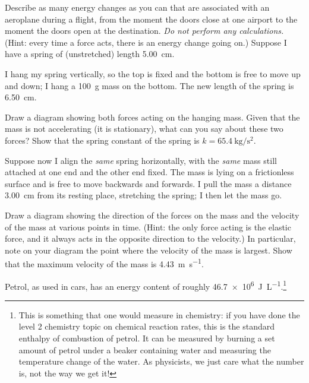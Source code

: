 \documentclass[answers]{exam}
\begin{document}
\begin{questions}
  \question Describe as many energy changes as you can that are associated with an aeroplane during a flight,
            from the moment the doors close at one airport to the moment the doors open
            at the destination. \emph{Do not perform any calculations.} (Hint: every time a force acts, there is an energy change
            going on.)
  \question Suppose I have a spring of (unstretched) length \SI{5.00}{\centi\metre}.
    \begin{parts}
      \item I hang my spring vertically, so the top is fixed and the bottom is free to
            move up and down; I hang a \SI{100}{\gram} mass on the bottom. The new
            length of the spring is \SI{6.50}{\centi\metre}.
        \begin{subparts}
          \subpart Draw a diagram showing both forces acting on the hanging mass. Given that
                   the mass is not accelerating (it is stationary), what can you say about these
                   two forces?
          \subpart Show that the spring constant of the spring is $ k = \SI{65.4}{\kilo\gram\per\second\squared} $.
        \end{subparts}
      \item Suppose now I align the \emph{same} spring horizontally, with the \emph{same} mass still attached at one end and the other end fixed.
            The mass is lying on a frictionless surface and is free to move backwards and forwards. I pull the mass a distance \SI{3.00}{\centi\metre}
            from its resting place, stretching the spring; I then let the mass go.
        \begin{subparts}
          \subpart Draw a diagram showing the direction of the forces on the mass and the velocity of the mass at various points in time. (Hint: the
                   only force acting is the elastic force, and it always acts in the opposite direction to the velocity.) In particular, note
                   on your diagram the point where the velocity of the mass is largest.
          \subpart Show that the maximum velocity of the mass is \SI{4.43}{\metre\per\second}.
        \end{subparts}
    \end{parts}
  \question Petrol, as used in cars, has an energy content of roughly \SI{46.7e6}{\joule\per\liter}.\footnote{This is something that one
            would measure in chemistry: if you have done the level 2 chemistry topic on chemical reaction rates, this is the standard
            enthalpy of combustion of petrol. It can be measured by burning a set amount of petrol under a beaker containing water
            and measuring the temperature change of the water. As physicists, we just care what the number is, not the way we get it!}
    \begin{parts}

\end{parts}
\end{questions}
\end{document}
